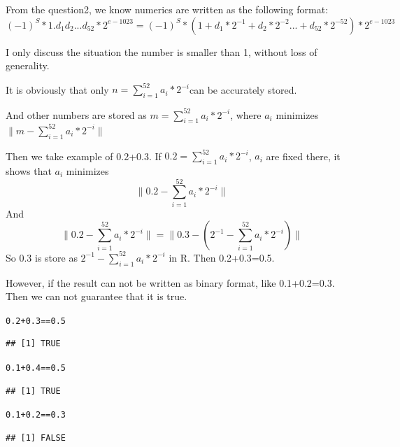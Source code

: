 \documentclass{article}\usepackage[]{graphicx}\usepackage[]{color}
\makeatletter
\newcommand{\hlnum}[1]{\textcolor[rgb]{0.686,0.059,0.569}{#1}}%
\newcommand{\hlopt}[1]{\textcolor[rgb]{0,0,0}{#1}}%
\newenvironment{kframe}{%
 \def\at@end@of@kframe{}%
 \ifinner\ifhmode%
  \def\at@end@of@kframe{\end{minipage}}%
  \begin{minipage}{\columnwidth}%
 \fi\fi%
 \def\FrameCommand##1{\hskip\@totalleftmargin \hskip-\fboxsep
 \colorbox{shadecolor}{##1}\hskip-\fboxsep
     \hskip-\linewidth \hskip-\@totalleftmargin \hskip\columnwidth}%
 \MakeFramed {\advance\hsize-\width
   \@totalleftmargin\z@ \linewidth\hsize
   \@setminipage}}%
 {\par\unskip\endMakeFramed%
 \at@end@of@kframe}
\newenvironment{knitrout}{}{} %
\makeatother
\begin{document}
From the question2, we know numerics are written as the following format:
$$(-1)^S*1.d_{1}d_{2}...d_{52}*2^{e-1023}=(-1)^S*(1+d_{1}*2^{-1}+d_{2}*2^{-2}...+d_{52}*2^{-52})*2^{e-1023}$$

I only discuss the situation the number is smaller than 1, without loss of generality. 

It is obviously that only $n=\sum_{i=1}^{52}a_{i}*2^{-i}$can be accurately stored. 

And other numbers are stored as $m=\sum_{i=1}^{52}a_{i}*2^{-i}$, where $a_{i}$ minimizes $\|m-\sum_{i=1}^{52}a_{i}*2^{-i}\|$

Then we take example of 0.2+0.3. If $0.2=\sum_{i=1}^{52}a_{i}*2^{-i}$, $a_{i}$ are fixed there, it shows that $a_{i}$ minimizes
$$\|0.2-\sum_{i=1}^{52}a_{i}*2^{-i}\|$$
And
$$\|0.2-\sum_{i=1}^{52}a_{i}*2^{-i}\|=\|0.3-(2^{-1}-\sum_{i=1}^{52}a_{i}*2^{-i})\|$$
So 0.3 is store as $2^{-1}-\sum_{i=1}^{52}a_{i}*2^{-i}$ in R. Then 0.2+0.3=0.5.

However, if the result can not be written as binary format, like 0.1+0.2=0.3. Then we can not guarantee that it is true.
\begin{knitrout}
\color{fgcolor}\begin{kframe}
\begin{alltt}
\hlnum{0.2}\hlopt{+}\hlnum{0.3}\hlopt{==}\hlnum{0.5}
\end{alltt}
\begin{verbatim}
## [1] TRUE
\end{verbatim}
\begin{alltt}
\hlnum{0.1}\hlopt{+}\hlnum{0.4}\hlopt{==}\hlnum{0.5}
\end{alltt}
\begin{verbatim}
## [1] TRUE
\end{verbatim}
\begin{alltt}
\hlnum{0.1}\hlopt{+}\hlnum{0.2}\hlopt{==}\hlnum{0.3}
\end{alltt}
\begin{verbatim}
## [1] FALSE
\end{verbatim}
\end{kframe}
\end{knitrout}
\end{document}
